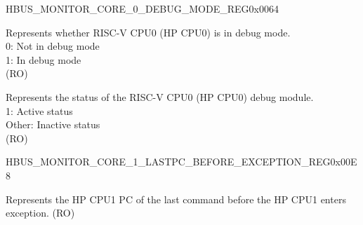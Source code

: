 \begin{register}{H}{BUS\_MONITOR\_CORE\_0\_DEBUG\_MODE\_REG}{0x0064}\label{regdesc:BUSMONITORCORE0DEBUGMODEREG}
%
%
%
\regnewline%
\begin{regdesc}\begin{reglist}
\label{fielddesc:BUSMONITORCORE0DEBUGMODE}\item [BUS\_MONITOR\_CORE\_0\_DEBUG\_MODE] Represents whether RISC-V CPU0 (HP CPU0) is in debug mode.\\
0: Not in debug mode\\
1: In debug mode\\ (RO)


\label{fielddesc:BUSMONITORCORE0DEBUGMODULEACTIVE}\item [BUS\_MONITOR\_CORE\_0\_DEBUG\_MODULE\_ACTIVE] Represents the status of the RISC-V CPU0 (HP CPU0) debug module.\\
1: Active status\\
Other: Inactive status\\ (RO)
\end{reglist}\end{regdesc}
\end{register}


\begin{register}{H}{BUS\_MONITOR\_CORE\_1\_LASTPC\_BEFORE\_EXCEPTION\_REG}{0x00E8}\label{regdesc:BUSMONITORCORE1LASTPCBEFOREEXCEPTIONREG}
%
\regnewline%
\begin{regdesc}\begin{reglist}
\label{fielddesc:BUSMONITORCORE1LASTPCBEFOREEXC}\item [BUS\_MONITOR\_CORE\_1\_LASTPC\_BEFORE\_EXC] Represents the HP CPU1 PC of the last command before the HP CPU1 enters exception. (RO)
\end{reglist}\end{regdesc}
\end{register}


